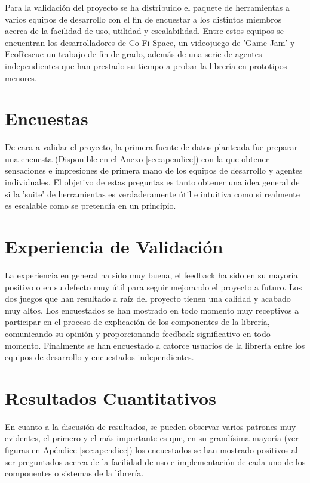 Para la validación del proyecto se ha distribuido el paquete de herramientas a varios equipos de desarrollo con el fin de encuestar a los distintos miembros acerca de la facilidad de uso, utilidad y escalabilidad.
 Entre estos equipos se encuentran los desarrolladores de Co-Fi Space\cite{CoFiSpace}, un videojuego de 'Game Jam' y EcoRescue\cite{EcoRescue} un trabajo de fin de grado, además de una serie de agentes 
 independientes que han prestado su tiempo a probar la librería en prototipos menores.

\section{Encuestas}

De cara a validar el proyecto, la primera fuente de datos planteada fue preparar una encuesta (Disponible en el Anexo \ref{sec:apendice}) con la que obtener sensaciones e impresiones de primera mano de los equipos
 de desarrollo y agentes individuales. El objetivo de estas preguntas es tanto obtener una idea general de si la 'suite' de herramientas es verdaderamente útil e intuitiva como si realmente es escalable como
 se pretendía en un principio.

\section{Experiencia de Validación}
La experiencia en general ha sido muy buena, el feedback ha sido en su mayoría positivo o en su defecto muy útil para seguir mejorando el proyecto a futuro. Los dos juegos que han resultado a raíz del proyecto 
tienen una calidad y acabado muy altos. Los encuestados se han mostrado en todo momento muy receptivos a participar en el proceso de explicación de los componentes de la librería, comunicando su opinión y 
proporcionando feedback significativo en todo momento. Finalmente se han encuestado a catorce usuarios de la librería entre los equipos de desarrollo y encuestados independientes.

\section{Resultados Cuantitativos}
En cuanto a la discusión de resultados, se pueden observar varios patrones muy evidentes, el primero y el más importante es que, en su grandísima mayoría (ver figuras en Apéndice \ref{sec:apendice}) los encuestados
se han mostrado positivos al ser preguntados acerca de la facilidad de uso e implementación de cada uno de los componentes o sistemas de la librería. 

